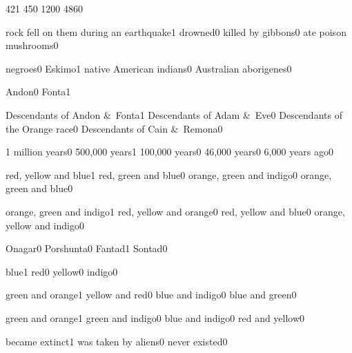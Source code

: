 {42}{1}
{45}{0}
{120}{0}
{486}{0}
\qstop

{rock fell on them during an earthquake}{1}
{drowned}{0}
{killed by gibbons}{0}
{ate poison mushrooms}{0}
\qstop

{negroes}{0}
{Eskimo}{1}
{native American indians}{0}
{Australian aborigenes}{0}
\qstop

{Andon}{0}
{Fonta}{1}
\qstop

{Descendants of Andon \&\ Fonta}{1}
{Descendants of Adam \&\ Eve}{0}
{Descendants of the Orange race}{0}
{Descendants of Cain \&\ Remona}{0}
\qstop


{1 million years}{0}
{500,000 years}{1}
{100,000 years}{0}
{46,000 years}{0}
{6,000 years ago}{0}
\qstop

{red, yellow and blue}{1}
{red, green and blue}{0}
{orange, green and indigo}{0}
{orange, green and blue}{0}
\qstop

{orange, green and indigo}{1}
{red, yellow and orange}{0}
{red, yellow and blue}{0}
{orange, yellow and indigo}{0}
\qstop

{Onagar}{0}
{Porshunta}{0}
{Fantad}{1}
{Sontad}{0}
\qstop

{blue}{1}
{red}{0}
{yellow}{0}
{indigo}{0}
\qstop

{green and orange}{1}
{yellow and red}{0}
{blue and indigo}{0}
{blue and green}{0}
\qstop

{green and orange}{1}
{green and indigo}{0}
{blue and indigo}{0}
{red and yellow}{0}
\qstop


{became extinct}{1}
{was taken by aliens}{0}
{never existed}{0}
\qstop

